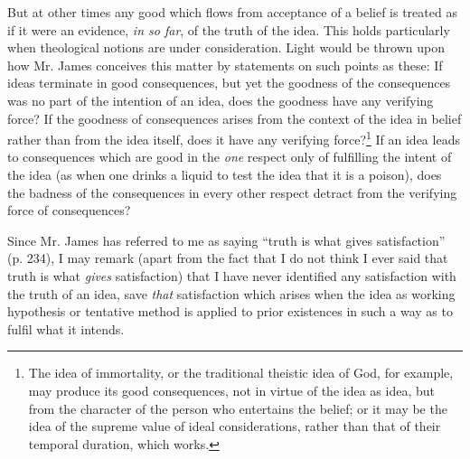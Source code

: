 \documentclass[12pt]{article}
\begin{document}
But at other times any good which flows from acceptance of a belief is
treated as if it were an evidence, \emph{in so far}, of the truth of the
idea. This holds particularly when theological notions are under
consideration. Light would be thrown upon how Mr. James conceives this
matter by statements on such points as these: If ideas terminate in
good consequences, but yet the goodness of the consequences was no
part of the intention of an idea, does the goodness have any verifying
force? If the goodness of consequences arises from the context of the
idea in belief rather than from the idea itself, does it have any
verifying force?\footnote{The idea of immortality, or the traditional theistic idea
of God, for example, may produce its good consequences, not in virtue
of the idea as idea, but from the character of the person who
entertains the belief; or it may be the idea of the supreme value of
ideal considerations, rather than that of their temporal duration,
which works.} If an idea leads to consequences which are good
in the \emph{one} respect only of fulfilling the intent of the idea (as
when one drinks a liquid to test the idea that it is a poison), does
the badness of the consequences in every other respect detract from
the verifying force of consequences?


Since Mr. James has referred to me as saying ``truth is what gives
satisfaction'' (p. 234), I may remark (apart from the fact that I do
not think I ever said that truth is what \emph{gives} satisfaction) that I
have never identified any satisfaction with the truth of an idea, save
\emph{that} satisfaction which arises when the idea as working hypothesis
or tentative method is applied to prior existences in such a way as to
fulfil what it intends.
\end{document}

